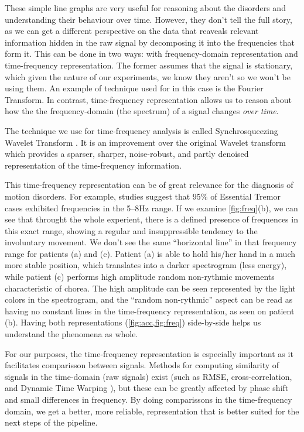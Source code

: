 These simple line graphs are very useful for reasoning about the disorders and understanding their behaviour over time. However, they don't tell the full story, as we can get a different perspective on the data that reaveals relevant information hidden in the raw signal by decomposing it into the frequencies that form it. This can be done in two ways: with frequency-domain representation and time-frequency representation. The former assumes that the signal is stationary, which given the nature of our experiments, we know they aren't so we won't be using them. An example of technique used for in this case is the Fourier Transform. In contrast, time-frequency representation allows us to reason about how the the frequency-domain (the spectrum) of a signal changes \textit{over time}.

The technique we use for time-frequency analysis is called Synchrosqueezing Wavelet Transform . It is an improvement over the original Wavelet transform  which provides a sparser, sharper, noise-robust, and partly denoised representation of the time-frequency information. 

This time-frequency representation can be of great relevance for the diagnosis of motion disorders. For example, studies suggest that 95\% of Essential Tremor cases exhibited frequencies in the 5--8Hz range. If we examine \cref{fig:freq}(b), we can see that throught the whole experient, there is a defined presence of frequences in this exact range, showing a regular and insuppressible tendency to the involuntary movement. We don't see the same ``horizontal line'' in that frequency range for patients (a) and (c). Patient (a) is able to hold his/her hand in a much more stable position, which translates into a darker spectrogram (less energy), while patient (c) performs high amplitude random non-rythmic movements characteristic of chorea. The high amplitude can be seen represented by the light colors in the spectrogram, and the ``random non-rythmic'' aspect can be read as having no constant lines in the time-frequency representation, as seen on patient (b). Having both representations (\cref{fig:acc,fig:freq}) side-by-side helps us understand the phenomena as whole. 

For our purposes, the time-frequency representation is especially important as it facilitates comparisson between signals. Methods for computing similarity of signals in the time-domain (raw signals) exist (such as RMSE, cross-correlation, and Dynamic Time Warping ), but these can be greatly affected by phase shift and small differences in frequency. By doing comparissons in the time-frequency domain, we get a better, more reliable, representation that is better suited for the next steps of the pipeline.

